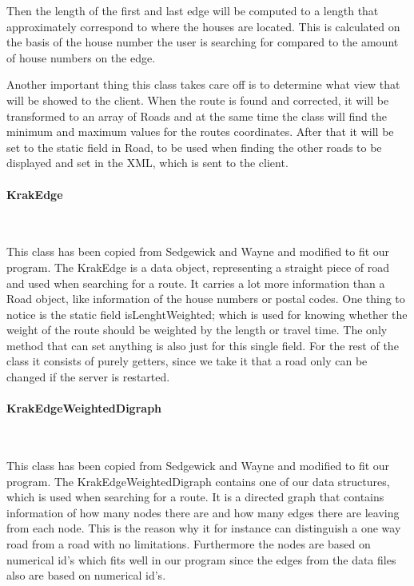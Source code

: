 \documentclass[a4paper,10pt,titlepage]{article}
\begin{document}
Then the length of the first and last edge will be computed to a length that approximately correspond to where the houses are located. This is calculated on the basis of the house number the user is searching for compared to the amount of house numbers on the edge.

Another important thing this class takes care off is to determine what view that will be showed to the client. When the route is found and corrected, it will be transformed to an array of Roads and at the same time the class will find the minimum and maximum values for the routes coordinates. After that it will be set to the static field in Road, to be used when finding the other roads to be displayed and set in the XML, which is sent to the client.

				\paragraph{KrakEdge \cite{sedgewickAndWayneDirectedEdge}}\mbox{}\
				

This class has been copied from Sedgewick and Wayne and modified to fit our program. The KrakEdge is a data object, representing a straight piece of road and used when searching for a route. It carries a lot more information than a Road object, like information of the house numbers or postal codes. One thing to notice is the static field isLenghtWeighted; which is used for knowing whether the weight of the route should be weighted by the length or travel time. The only method that can set anything is also just for this single field. For the rest of the class it consists of purely getters, since we take it that a road only can be changed if the server is restarted.
				
				\paragraph{KrakEdgeWeightedDigraph \cite{sedgewickAndWayneEdgeWeightedDigraph}}\mbox{}\
				

This class has been copied from Sedgewick and Wayne and modified to fit our program. The KrakEdgeWeightedDigraph contains one of our data structures, which is used when searching for a route. It is a directed graph that contains information of how many nodes there are and how many edges there are leaving from each node. This is the reason why it for instance can distinguish a one way road from a road with no limitations. Furthermore the nodes are based on numerical id’s which fits well in our program since the edges from the data files also are based on numerical id’s. \\
\end{document}
